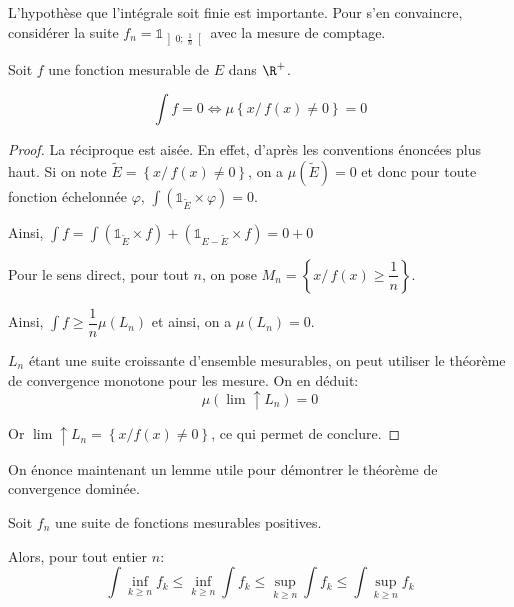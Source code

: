 L'hypothèse que l'intégrale soit finie est importante.  Pour s'en convaincre, considérer la suite $f_n = \mathbb{1}_{\left]0;~\tfrac{1}{n}\right[}$ avec la mesure de comptage.

\begin{prop}
Soit $f$ une fonction mesurable de $E$ dans $\R^{+}$.

\[
\displaystyle{\int} f = 0 \iff \mu\left\{x / \, f(x) \neq 0 \right \} = 0
\]
\end{prop}


\begin{proof}
La réciproque est aisée. En effet, d'après les conventions énoncées plus haut. Si on note $\tilde{E} = \left\{x / \, f(x) \neq 0 \right \}$, on a $\mu\left(\tilde{E}\right) = 0$ et donc pour toute fonction échelonnée $\varphi$, $\displaystyle{\int} \left(\mathbb{1}_{\tilde{E}} \times \varphi \right) = 0$. 

Ainsi, $\displaystyle{\int} f = \displaystyle{\int} \left(\mathbb{1}_{\tilde{E}} \times f\right) + \left(\mathbb{1}_{E-\tilde{E}} \times f\right) = 0 + 0$

Pour le sens direct, pour tout $n$, on pose $M_n = \left\{ x / \, f(x) \geq \dfrac{1}{n}\right \}$.

Ainsi, $\displaystyle{\int} f \geq \dfrac{1}{n} \mu(L_n)$ et ainsi, on a $\mu(L_n)=0$.

$L_n$ étant une suite croissante d'ensemble mesurables, on peut utiliser le théorème de convergence monotone pour les mesure. On en déduit:
\[
\mu\left(\lim \uparrow L_n\right) = 0
\]

Or $\lim \uparrow L_n = \left\{ x / f(x) \neq 0\right \}$, ce qui permet de conclure.
\end{proof}

On énonce maintenant un lemme utile pour démontrer le théorème de convergence dominée.

\begin{lem}[Fatou]
Soit $f_n$ une suite de fonctions mesurables positives. 

Alors, pour tout entier $n$:
\[
\displaystyle{\int} \inf \limits_{k \geq n} f_k \leq \inf \limits_{k \geq n} \displaystyle{\int} f_k \leq \sup \limits_{k \geq n} \displaystyle{\int} f_k \leq \displaystyle{\int} \sup \limits_{k \geq n} f_k
\]

\end{lem}

